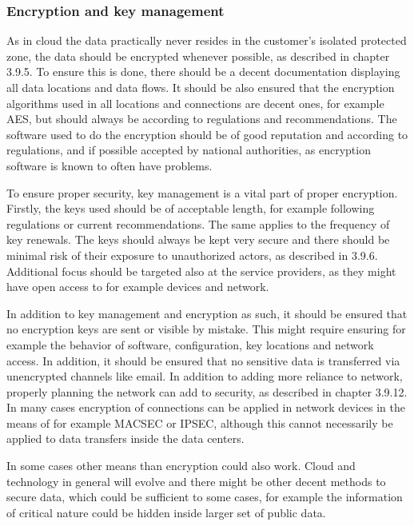 \documentclass{article}
\begin{document}
\subsubsection{Encryption and key management} %
As in cloud the data practically never resides in the customer's isolated protected zone, the data should be encrypted whenever possible, as described in chapter 3.9.5. To ensure this is done, there should be a decent documentation displaying all data locations and data flows. It should be also ensured that the encryption algorithms used in all locations and connections are decent ones, for example AES, but should always be according to regulations and recommendations. The software used to do the encryption should be of good reputation and according to regulations, and if possible accepted by national authorities, as encryption software is known to often have problems.
\par
To ensure proper security, key management is a vital part of proper encryption. Firstly, the keys used should be of acceptable length, for example following regulations or current recommendations. The same applies to the frequency of key renewals. The keys should always be kept very secure and there should be minimal risk of their exposure to unauthorized actors, as described in 3.9.6. Additional focus should be targeted also at the service providers, as they might have open access to for example devices and network.
\par
In addition to key management and encryption as such, it should be ensured that no encryption keys are sent or visible by mistake. This might require ensuring for example the behavior of software, configuration, key locations and network access. In addition, it should be ensured that no sensitive data is transferred via unencrypted channels like email. In addition to adding more reliance to network, properly planning the network can add to security, as described in chapter 3.9.12. In many cases encryption of connections can be applied in network devices in the means of for example MACSEC or IPSEC, although this cannot necessarily be applied to data transfers inside the data centers.
\par
In some cases other means than encryption could also work. Cloud and technology in general will evolve and there might be other decent methods to secure data, which could be sufficient to some cases, for example the information of critical nature could be hidden inside larger set of public data.
\end{document}
